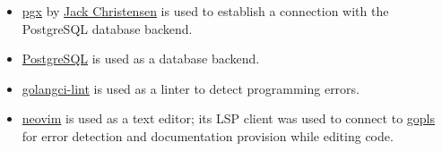 \begin{itemize}
	\item \href{https://github.com/jackc/pgx}{pgx} by
		\href{https://jackchristensen.com/}{Jack Christensen} is used
		to establish a connection with the PostgreSQL database backend.

	\item \href{https://www.postgresql.org/}{PostgreSQL} is used as a
		database backend.

	\item \href{https://golangci-lint.run/}{golangci-lint} is used as a
		linter to detect programming errors.

	\item \href{https://neovim.io/}{neovim} is used as a text editor; its
		LSP client was used to connect to
		\href{https://pkg.go.dev/golang.org/x/tools/gopls}{gopls} for
		error detection and documentation provision while editing code.

\end{itemize}




